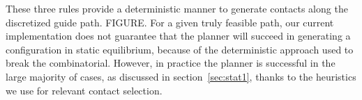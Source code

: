 These three rules provide a deterministic manner to generate contacts along the discretized guide path.
FIGURE. For a given truly feasible path, our current implementation does not guarantee that the planner will succeed in generating a configuration in static equilibrium, because
of the deterministic approach used to break the combinatorial.
However, in practice the planner is successful in the large majority of cases, as discussed in section~\ref{sec:stat1}, thanks to 
the heuristics we use for relevant contact selection.
